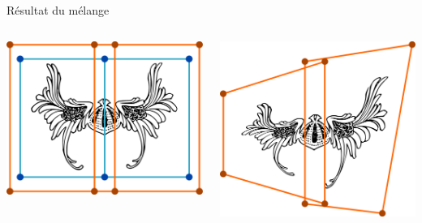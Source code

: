 \documentclass[xcolor=x11names,compress]{beamer}
\renewcommand{\(}{\begin{columns}} \renewcommand{\)}{\end{columns}}
\newcommand{\<}[1]{\begin{column}{#1}} \renewcommand{\>}{\end{column}}
\begin{document}
\begin{frame}{Résultat du mélange}
  \begin{columns}[t]
    \begin{column}{0.5\textwidth}
      \centering
      \includegraphics[scale=0.15]{Deformation-Viking-Avant}
    \end{column}
    \begin{column}{0.5\textwidth}
      \centering
      \includegraphics[scale=0.15]{Deformation-Viking-Apres-Sans}
    \end{column}
  \end{columns}
\end{frame}
\end{document}
